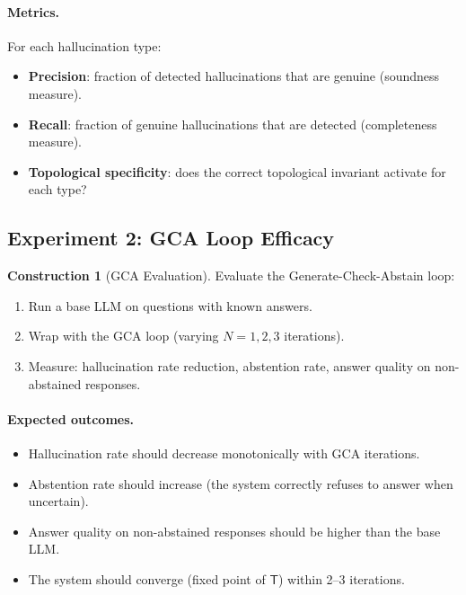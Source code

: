 \documentclass[11pt,a4paper]{article}
\theoremstyle{plain}
\theoremstyle{definition}
\newtheorem{construction}[theorem]{Construction}
\theoremstyle{remark}
\newcommand{\SemanticT}{\mathsf{T}}
\begin{document}
\paragraph{Metrics.} For each hallucination type:
\begin{itemize}[nosep]
  \item \textbf{Precision}: fraction of detected hallucinations that are genuine (soundness measure).
  \item \textbf{Recall}: fraction of genuine hallucinations that are detected (completeness measure).
  \item \textbf{Topological specificity}: does the correct topological invariant activate for each type?
\end{itemize}

\subsection{Experiment 2: GCA Loop Efficacy}

\begin{construction}[GCA Evaluation]\label{con:gca-eval}
Evaluate the Generate-Check-Abstain loop:
\begin{enumerate}[nosep]
  \item Run a base LLM on questions with known answers.
  \item Wrap with the GCA loop (varying $N = 1, 2, 3$ iterations).
  \item Measure: hallucination rate reduction, abstention rate, answer quality on non-abstained responses.
\end{enumerate}
\end{construction}

\paragraph{Expected outcomes.}
\begin{itemize}[nosep]
  \item Hallucination rate should decrease monotonically with GCA iterations.
  \item Abstention rate should increase (the system correctly refuses to answer when uncertain).
  \item Answer quality on non-abstained responses should be higher than the base LLM.
  \item The system should converge (fixed point of $\SemanticT$) within 2--3 iterations.
\end{itemize}
\end{document}
